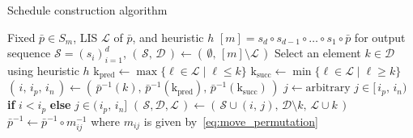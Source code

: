 \documentclass[sn-mathphys]{sn-jnl}
\begin{document}
  \begin{algorithm}[h!]
	\caption{Schedule construction algorithm}\label{alg:sorting}
    \begin{algorithmic}[1]
    	\Require Fixed $\bar{p} \in S_m$, LIS $\mathcal{L}$ of $\bar{p}$, and heuristic $h$
    	\Ensure $[m] = s_d \circ s_{d-1} \circ \dots \circ s_1 \circ \bar{p}$ for output sequence $\mathcal{S} = (s_i)_{i=1}^d$,
    	 
    		\State $(\, \mathcal{S}, \, \mathcal{D} \,  )\gets (\, \emptyset, \, [m] \setminus \mathcal{L} \,)$
    		    \State Select an element $k \in \mathcal{D}$ using heuristic $h$    		        	
				\State $\mathrm{k}_{\text{pred}} \gets \max \{ \ell \in \mathcal{L} \mid \ell \leq k \}$
				\State $\mathrm{k}_{\text{succ}} \gets \min \{ \ell \in \mathcal{L} \mid \ell \geq k \}$  
    		    \State $(\,i, \,i_p, \, i_n \,) \gets ( \, \bar{p}^{-1}(k), \, \bar{p}^{-1}(\mathrm{k}_{\text{pred}}), \, \bar{p}^{-1}(\mathrm{k}_{\text{succ}} ) \, )$ 
				\State $j \gets \text{arbitrary } j \in [\, i_p, \, i_n)$ \textbf{if} $i < i_p$ \textbf{else} $j \in (\, i_p, \, i_n]$ 
    		    \State $(\, \mathcal{S}, \mathcal{D}, \mathcal{L} \,) \gets (\, \mathcal{S} \cup (i, \, j), \, \mathcal{D} \setminus k, \, \mathcal{L} \cup k \, )$
    		    \State $\bar{p}^{-1} \gets \bar{p}^{-1} \circ m_{ij}^{-1}$ where $m_{ij}$ is given by~\eqref{eq:move_permutation}
    		 \EndWhile
    		 \State {}
    	\EndFunction
	\end{algorithmic}
\end{algorithm}
\end{document}
